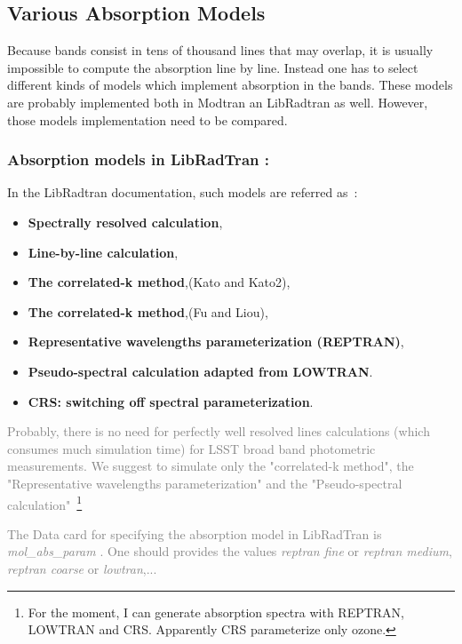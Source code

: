 \documentclass[a4paper]{article}
\begin{document}
\subsection{Various Absorption Models}
Because bands consist in tens of thousand lines that may overlap, it is usually impossible to compute the absorption line by line.
Instead one has to select different kinds of models which implement absorption in the bands.
These models are probably implemented both in Modtran an LibRadtran as well. However, those models implementation need to be compared.

\subsubsection{Absorption models in LibRadTran :}

In the LibRadtran documentation, such models are referred as~:
\begin{itemize}
\item {\bf Spectrally resolved  calculation},
\item {\bf Line-by-line calculation},
\item {\bf The correlated-k method},(Kato and Kato2),
\item {\bf The correlated-k method},(Fu and Liou),
\item {\bf Representative wavelengths parameterization (REPTRAN)},
\item {\bf Pseudo-spectral calculation adapted from LOWTRAN}. 
\item {\bf CRS: switching off spectral parameterization}. 
\end{itemize} 

\textcolor{gray}{Probably, there is no need for perfectly well resolved lines calculations (which consumes much simulation time) for LSST broad band photometric measurements.
We suggest to simulate only the "correlated-k method", the "Representative wavelengths parameterization" and the "Pseudo-spectral calculation"~\footnote{For the moment, I can generate absorption spectra with REPTRAN, LOWTRAN and CRS. Apparently CRS parameterize only ozone. }}


\textcolor{gray}{The Data card for specifying the absorption model in LibRadTran is  \textit{mol\_abs\_param} . One should provides the values \textit{reptran fine} or  \textit{reptran medium}, \textit{reptran coarse} or \textit{lowtran},...}
\end{document}
